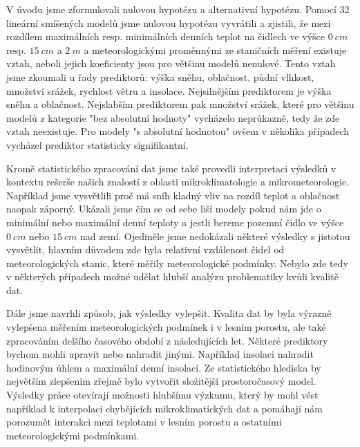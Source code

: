 V úvodu jsme zformulovali nulovou hypotézu a alternativní hypotézu. Pomocí 32 lineární smíšených modelů jsme nulovou hypotézu vyvrátili a zjistili, že mezi rozdílem maximálních resp. minimálních denních teplot na čidlech ve výšce $\SI{0}{cm}$ resp. $\SI{15}{cm}$ a $\SI{2}{m}$ a meteorologickými proměnnými ze staničních měření existuje vztah, neboli jejich koeficienty jsou pro většinu modelů nenulové. Tento vztah jsme zkoumali u řady prediktorů: výška sněhu, oblačnost, půdní vlhkost, množství srážek, rychlost větru a insolace. Nejsilnějším prediktorem je výška sněhu a oblačnost. Nejslabším prediktorem pak množství srážek, které pro většinu modelů z kategorie "bez absolutní hodnoty" vycházelo neprůkazně, tedy že zde vztah neexistuje. Pro modely "s absolutní hodnotou" ovšem v několika případech vycházel prediktor statisticky signifikantní.

Kromě statistického zpracování dat jsme také provedli interpretaci výsledků v kontextu rešerše našich znalostí z oblasti mikroklimatologie a mikrometeorologie. Například jsme vysvětlili proč má sníh kladný vliv na rozdíl teplot a oblačnost naopak záporný. Ukázali jsme čím se od sebe liší modely pokud nám jde o minimální nebo maximální denní teploty a jestli bereme pozemní čidlo ve výšce $\SI{0}{cm}$ nebo $\SI{15}{cm}$ nad zemí. Ojediněle jsme nedokázali některé výsledky s jistotou vysvětlit, hlavním důvodem zde byla relativní vzdálenost čidel od meteorologických stanic, které měřily meteorologické podmínky. Nebylo zde tedy v některých případech možné udělat hlubší analýzu problematiky kvůli kvalitě dat.

Dále jsme navrhli způsob, jak výsledky vylepšit. Kvalita dat by byla výrazně vylepšena měřením meteorologických podmínek i v lesním porostu, ale také zpracováním delšího časového období z následujících let. Některé prediktory bychom mohli upravit nebo nahradit jinými. Například insolaci nahradit hodinovým úhlem a maximální denní insolací. Ze statistického hlediska by největším zlepšením zřejmě bylo vytvořit složitější prostoročasový model. Výsledky práce otevírají možnosti hlubšímu výzkumu, který by mohl vést například k interpolaci chybějících mikroklimatických dat a pomáhají nám porozumět interakci mezi teplotami v lesním porostu a ostatními meteorologickými podmínkami.
